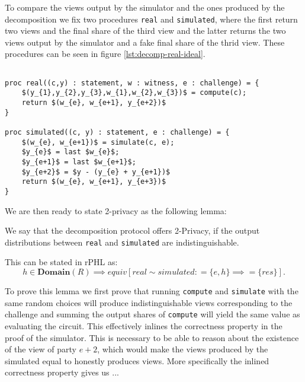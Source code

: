To compare the views output by the simulator and the ones produced by the decomposition we fix two procedures \texttt{real} and \texttt{simulated}, where the first return two views and the final share of the third view and the latter returns the two views output by the simulator and a fake final share of the thrid view. These procedures can be seen in figure \ref{lst:decomp-real-ideal}.

\begin{lstlisting}[float, mathescape,label=lst:decomp-real-ideal,caption= Real/Simulated view of decomposition]

proc real((c,y) : statement, w : witness, e : challenge) = {
    $(y_{1},y_{2},y_{3},w_{1},w_{2},w_{3})$ = compute(c);
    return $(w_{e}, w_{e+1}, y_{e+2})$
}

proc simulated((c, y) : statement, e : challenge) = {
    $(w_{e}, w_{e+1})$ = simulate(c, e);
    $y_{e}$ = last $w_{e}$;
    $y_{e+1}$ = last $w_{e+1}$;
    $y_{e+2}$ = $y - (y_{e} + y_{e+1})$
    return $(w_{e}, w_{e+1}, y_{e+3})$
}

\end{lstlisting}

We are then ready to state 2-privacy as the following lemma:
\begin{lemma}
  \label{lem:zkboo:decomposition:privacy}
  We say that the decomposition protocol offers 2-Privacy, if the output
  distributions between \texttt{real} and \texttt{simulated} are
  indistinguishable.


  This can be stated in rPHL as:
  \[
    h \in \textbf{Domain}(R) \implies
    equiv[real \sim simulated : =\{e, h\} \implies =\{res\}].
  \]

\end{lemma}

To prove this lemma we first prove that running \texttt{compute} and
\texttt{simulate} with the same random choices will produce indistinguishable
views corresponding to the challenge and summing the output shares of
\texttt{compute} will yield the same value as evaluating the circuit. This
effectively inlines the correctness property in the proof of the simulator. This
is necessary to be able to reason about the existence of the view of party
$e+2$, which would make the views produced by the simulated equal to honestly
produces views.
More specifically the inlined correctness property gives us ...

